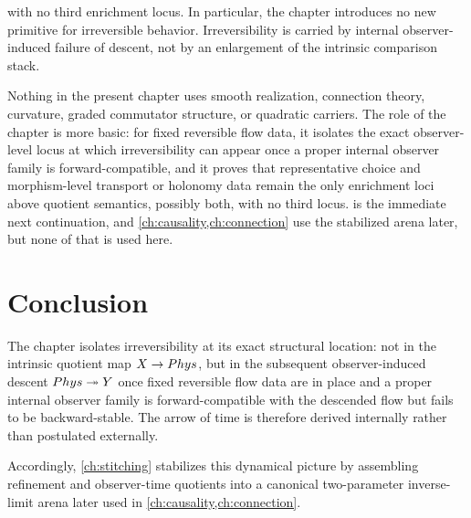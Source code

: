with no third enrichment locus.
In particular, the chapter introduces no new primitive for irreversible
behavior. Irreversibility is carried by internal observer-induced
failure of descent, not by an enlargement of the intrinsic comparison
stack.
\begin{remark}
	Nothing in the present chapter uses smooth realization, connection
	theory, curvature, graded commutator structure, or quadratic carriers.
	The role of the chapter is more basic: for fixed reversible flow data,
	it isolates the exact observer-level locus at which irreversibility can
	appear once a proper internal observer family is forward-compatible, and
	it proves that representative choice and morphism-level transport or
	holonomy data remain the only enrichment loci above quotient semantics,
	possibly both, with no third locus.  is the
	immediate next continuation, and \cref{ch:causality,ch:connection} use
	the stabilized arena later, but none of that is used here.
\end{remark}

\section{Conclusion}
\label{sec:flow-conclusion}
The chapter isolates irreversibility at its exact structural location:
not in the intrinsic quotient map \(X\to Phys\), but in the subsequent
observer-induced descent \(Phys\twoheadrightarrow Y\) once fixed
reversible flow data are in place and a proper internal observer family
is forward-compatible with the descended flow but fails to be
backward-stable. The arrow of time is therefore derived internally
rather than postulated externally.

Accordingly, \cref{ch:stitching} stabilizes this dynamical picture by
assembling refinement and observer-time quotients into a canonical
two-parameter inverse-limit arena later used in
\cref{ch:causality,ch:connection}.

\begin{chapterclosing}
\end{chapterclosing}
